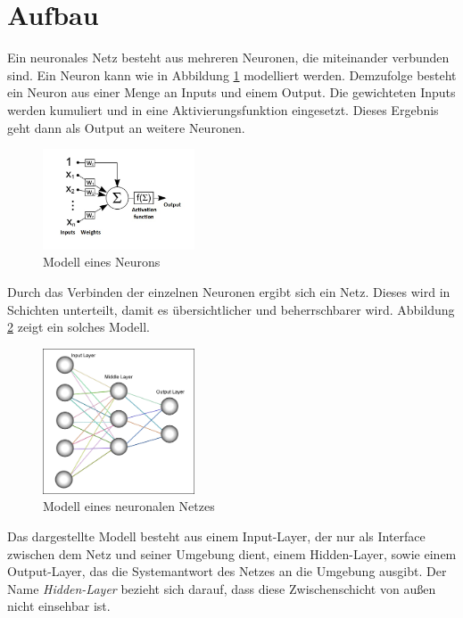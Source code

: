 
\section{Aufbau}
Ein neuronales Netz besteht aus mehreren Neuronen, die miteinander verbunden sind. Ein Neuron kann wie in Abbildung \ref{neuron} modelliert werden. Demzufolge besteht ein Neuron aus einer Menge an Inputs und einem Output. Die gewichteten Inputs werden kumuliert und in eine Aktivierungsfunktion eingesetzt. Dieses Ergebnis geht dann als Output an weitere Neuronen. 
\begin{figure}[h]
\centering
\includegraphics[width=0.4\textwidth]{pictures/neuron.jpg}
\caption{Modell eines Neurons \cite{bib:neuron}}
\label{neuron}
\end{figure}

Durch das Verbinden der einzelnen Neuronen ergibt sich ein Netz. Dieses wird in Schichten unterteilt, damit es übersichtlicher und beherrschbarer wird. Abbildung \ref{network} zeigt ein solches Modell.
\begin{figure}[h]
\centering
\includegraphics[width=0.4\textwidth]{pictures/neural-network.png}
\caption{Modell eines neuronalen Netzes \cite{bib:neuron}}
\label{network}
\end{figure}

Das dargestellte Modell besteht aus einem Input-Layer, der nur als Interface zwischen dem Netz und seiner Umgebung dient, einem Hidden-Layer, sowie einem Output-Layer, das die Systemantwort des Netzes an die Umgebung ausgibt. Der Name \emph{Hidden-Layer} bezieht sich darauf, dass diese Zwischenschicht von außen nicht einsehbar ist.

